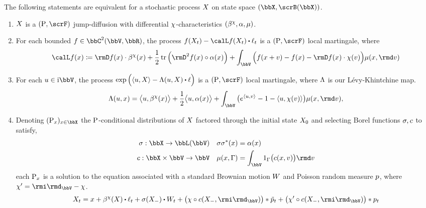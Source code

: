 \begin{theorem}
  \label{theorem:jump-diffusion-characterizations}
  The following statements are equivalent for a stochastic process $X$ on state space $(\stateSpace, \scrB(\stateSpace))$.
  \begin{enumerate}[label=(\alph*)]
    \item
      $X$ is a $(\Prb, \scrF)$ jump-diffusion with differential $\chi$-characteristics $(\beta^\chi, \alpha, \mu)$.
    \item
      For each bounded $f \in \ccpathSpace{2}{\vecSpace}{\bbR}$, the process $f(\X_t) - \generator f(\X_t) \shortInt \leb_t$ is a $(\Prb, \scrF)$ local martingale, where
      \[
        \generator f(\stateVar) \defeq \Der f(\stateVar) \cdot \affDrift^\trunc(\stateVar) + \frac12 \tr\Big( \Hess f(\stateVar) \circ \affDiff(\stateVar) \Big) + \int_\vecSpace \Big( f(\stateVar + \markVar) - f(\stateVar) - \Der f(\stateVar) \cdot \trunc(\markVar) \Big) \affJump(\stateVar, \rmd\markVar)
      \]
    \item
      For each $\momentVar \in \im\vecSpace$, the process $\exp\Big(\prj{\momentVar}{\X} - \ode(\momentVar, \X) \shortInt \leb \Big)$ is a $(\Prb, \scrF)$ local martingale, where $\Lambda$ is our L\'evy-Khintchine map.
      \[
        \ode(\momentVar, \stateVar) = \bprj{\momentVar}{\affDrift^\trunc(\stateVar)} + \frac12\bprj{\momentVar}{\affDiff(\stateVar)} + \int_\vecSpace \big( e^\prj{\momentVar}{\markVar} - 1 - \prj{\momentVar}{\trunc(\markVar)} \big) \affJump(\stateVar, \rmd\markVar),
      \]
    \item
      Denoting $(\Prb_\stateVar)_{\stateVar\in\stateSpace}$ the ${\operatorname{P}}$-conditional distributions of $X$ factored through the initial state $X_0$ and selecting Borel functions $\sigma, c$ to satisfy,
      \begin{equation}
        \label{eq:sde-terms}
        \begin{aligned}
          \affDiffSqrt: \stateSpace \rightarrow \bbL(\vecSpace) && \affDiffSqrt\affDiffSqrt^*(\stateVar) &= \affDiff(\stateVar) \\
          \thinner: \stateSpace \times \vecSpace \rightarrow \vecSpace && \affJump(\stateVar, \Gamma) &= \int_\vecSpace 1_\Gamma\big( \thinner(\stateVar, \markVar) \big) \rmd\markVar
        \end{aligned}
      \end{equation}
      each ${\operatorname{P}}_x$ is a solution to the equation associated with a standard Brownian motion $W$ and Poisson random measure $p$, where $\trunc' = \id_\vecSpace - \trunc$.
      \begin{equation*}
        \X_t = \stateVar + \affDrift^\trunc(\X) \shortInt \leb_t + \sigma(\X_-) \shortInt \W_t + \big( \trunc \circ \thinner(\X_-, \id_\vecSpace) \big) \ast \compensate{\poisRM}_t + \big( \trunc' \circ \thinner(\X_-, \id_\vecSpace) \big) \ast \poisRM_t
      \end{equation*}
  \end{enumerate}
\end{theorem}
